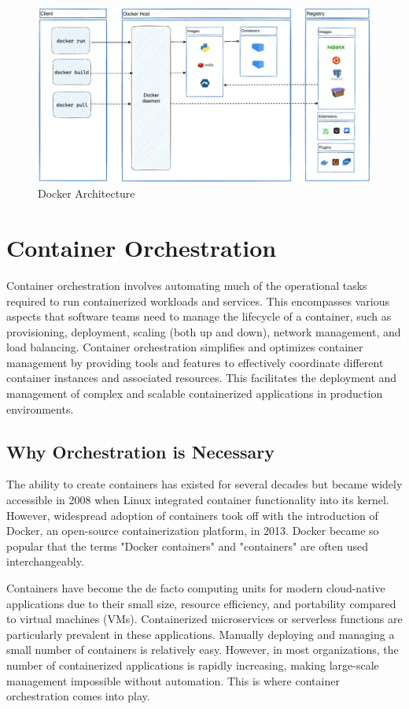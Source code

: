 \begin{figure}[h]
  \centering
  \includegraphics[width=\textwidth]{Figures/docker-architecture.png}
  \caption{Docker Architecture}
  \label{fig:container_architecture}
\end{figure}

\section{Container Orchestration}

Container orchestration involves automating much of the operational tasks required to run containerized workloads and services. This encompasses various aspects that software teams need to manage the lifecycle of a container, such as provisioning, deployment, scaling (both up and down), network management, and load balancing. Container orchestration simplifies and optimizes container management by providing tools and features to effectively coordinate different container instances and associated resources. This facilitates the deployment and management of complex and scalable containerized applications in production environments.

\subsection{Why Orchestration is Necessary}

The ability to create containers has existed for several decades but became widely accessible in 2008 when Linux integrated container functionality into its kernel. However, widespread adoption of containers took off with the introduction of Docker, an open-source containerization platform, in 2013. Docker became so popular that the terms "Docker containers" and "containers" are often used interchangeably.

Containers have become the de facto computing units for modern cloud-native applications due to their small size, resource efficiency, and portability compared to virtual machines (VMs). Containerized microservices or serverless functions are particularly prevalent in these applications. Manually deploying and managing a small number of containers is relatively easy. However, in most organizations, the number of containerized applications is rapidly increasing, making large-scale management impossible without automation. This is where container orchestration comes into play.

